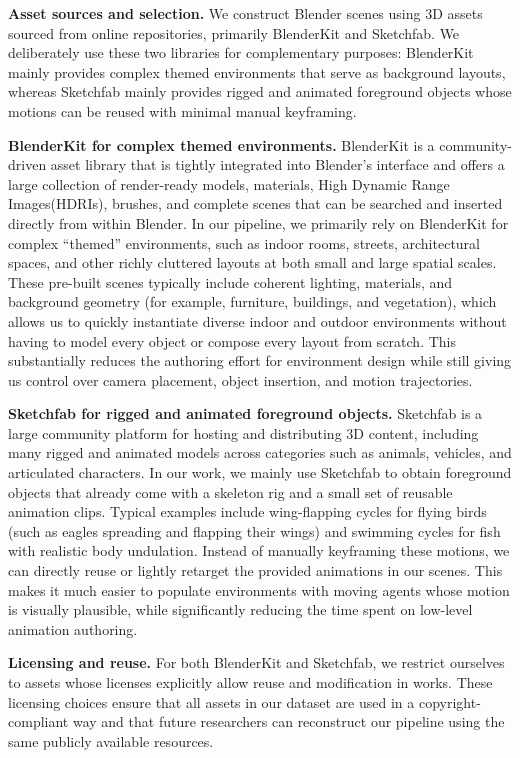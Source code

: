 \noindent\textbf{Asset sources and selection.}
We construct Blender scenes using 3D assets sourced from online repositories,
primarily BlenderKit and Sketchfab. We deliberately use these two libraries for
complementary purposes: BlenderKit mainly provides complex themed environments
that serve as background layouts, whereas Sketchfab mainly provides rigged and
animated foreground objects whose motions can be reused with minimal manual
keyframing.

\noindent\textbf{BlenderKit for complex themed environments.}
BlenderKit is a community-driven asset library that is tightly integrated into
Blender’s interface and offers a large collection of render-ready models,
materials, High Dynamic Range Images(HDRIs), brushes, and complete scenes that can be searched and
inserted directly from within Blender. In our pipeline, we primarily rely on
BlenderKit for complex “themed” environments, such as indoor rooms, streets, architectural spaces, and other richly cluttered layouts at both small and large spatial scales. These pre-built scenes typically include coherent lighting, materials, and background geometry (for example, furniture, buildings, and vegetation), which allows us to quickly instantiate diverse indoor and outdoor environments without having to model every object or compose every layout from scratch. This substantially reduces the authoring effort for environment design while still giving us control over camera placement, object insertion, and motion trajectories.

\noindent\textbf{Sketchfab for rigged and animated foreground objects.} Sketchfab is a large community platform for hosting and distributing 3D content, including many rigged and animated models across categories such as animals, vehicles, and articulated characters. In our work, we mainly use Sketchfab to obtain foreground objects that already come with a skeleton rig and a small set of reusable animation clips. Typical examples include wing-flapping cycles for flying birds (such as eagles spreading and flapping their wings) and swimming cycles for fish with realistic body undulation. Instead of manually keyframing these motions, we can directly reuse or lightly retarget the provided animations in our scenes. This makes it much easier to populate environments with moving agents whose motion is visually plausible, while significantly reducing the time spent on low-level animation authoring.

\noindent\textbf{Licensing and reuse.} For both BlenderKit and Sketchfab, we restrict ourselves to assets whose licenses explicitly allow reuse and modification in works. These licensing choices ensure that all assets in our dataset are used in a copyright-compliant way and that future researchers can reconstruct our pipeline using the same publicly available resources.

